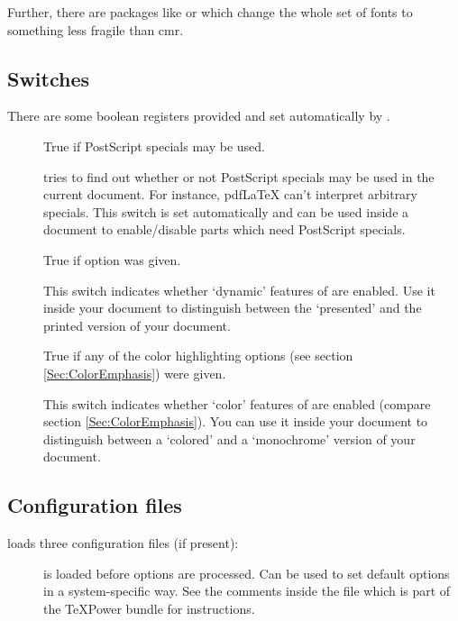 \begin{slide}
Further, there are packages like  or  which change the whole set of fonts to something less
fragile than cmr.

\newslide

\subsection{Switches}
There are some boolean registers provided and set automatically by .

\begin{description}
\item[] True if PostScript\textsuperscript{\textregistered} specials may be
  used.

   tries to find out whether or not PostScript\textsuperscript{\textregistered} specials may be used in
  the current document. For instance, pdf\LaTeX{} can't interpret arbitrary specials. This switch is set automatically
  and can be used inside a document to enable/disable parts which need PostScript\textsuperscript{\textregistered}
  specials.

\newslide

\item[] True if  option was given.

  This switch indicates whether `dynamic' features of  are enabled. Use it inside your document
  to distinguish between the `presented' and the printed version of your document.

\item[] True if any of the color highlighting options (see section
  \ref{Sec:ColorEmphasis}) were given.

  This switch indicates whether `color' features of  are enabled (compare section
  \ref{Sec:ColorEmphasis}). You can use it inside your document to distinguish between a `colored' and a `monochrome'
  version of your document.
\end{description}

\newslide

\subsection{Configuration files}\label{Sec:Config}
 loads three configuration files (if present):
\begin{description}
\item[]
  is loaded before options are processed. Can be used to set default options
  in a system-specific way. See the comments inside the file
   which is part of the \TeX Power bundle
  for instructions.


\end{description}
\end{slide}
